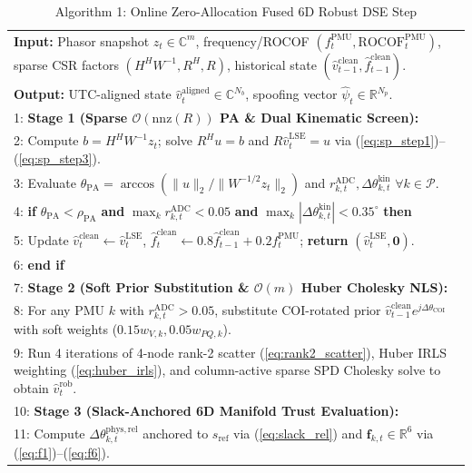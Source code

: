 \documentclass[journal,twoside]{IEEEtran}
\begin{document}
\begin{table}[!t]
\centering
\footnotesize
\caption{Algorithm 1: Online Zero-Allocation Fused 6D Robust DSE Step}
\label{tab:algo1}
\begin{tabular}{p{8.3cm}}
\toprule
\textbf{Input:} Phasor snapshot $z_t \in \mathbb{C}^m$, frequency/ROCOF $(f_t^{\mathrm{PMU}}, \mathrm{ROCOF}_t^{\mathrm{PMU}})$, sparse CSR factors $(H^H W^{-1}, R^H, R)$, historical state $(\hat{v}_{t-1}^{\mathrm{clean}}, \hat{f}_{t-1}^{\mathrm{clean}})$. \\
\textbf{Output:} UTC-aligned state $\hat{v}_t^{\mathrm{aligned}} \in \mathbb{C}^{N_b}$, spoofing vector $\hat{\psi}_t \in \mathbb{R}^{N_p}$. \\
\midrule
1: \textbf{Stage 1 (Sparse $\mathcal{O}(\mathrm{nnz}(R))$ PA \& Dual Kinematic Screen):} \\
2: Compute $b = H^H W^{-1}z_t$; solve $R^H u = b$ and $R\hat{v}_t^{\mathrm{LSE}} = u$ via (\ref{eq:sp_step1})--(\ref{eq:sp_step3}). \\
3: Evaluate $\theta_{\mathrm{PA}} = \arccos(\|u\|_2 / \|W^{-1/2}z_t\|_2)$ and $r_{k,t}^{\mathrm{ADC}}, \Delta\theta_{k,t}^{\mathrm{kin}}$ $\forall k \in \mathcal{P}$. \\
4: \textbf{if} $\theta_{\mathrm{PA}} < \rho_{\mathrm{PA}}$ \textbf{and} $\max_k r_{k,t}^{\mathrm{ADC}} < 0.05$ \textbf{and} $\max_k |\Delta\theta_{k,t}^{\mathrm{kin}}| < 0.35^\circ$ \textbf{then} \\
5: \quad Update $\hat{v}_t^{\mathrm{clean}} \gets \hat{v}_t^{\mathrm{LSE}}$, $\hat{f}_t^{\mathrm{clean}} \gets 0.8\hat{f}_{t-1}^{\mathrm{clean}} + 0.2 f_t^{\mathrm{PMU}}$; \textbf{return} $(\hat{v}_t^{\mathrm{LSE}}, \mathbf{0})$. \\
6: \textbf{end if} \\
7: \textbf{Stage 2 (Soft Prior Substitution \& $\mathcal{O}(m)$ Huber Cholesky NLS):} \\
8: For any PMU $k$ with $r_{k,t}^{\mathrm{ADC}} > 0.05$, substitute COI-rotated prior $\hat{v}_{t-1}^{\mathrm{clean}}e^{j\Delta\theta_{\mathrm{COI}}}$ with soft weights ($0.15 w_{V,k}, 0.05 w_{PQ,k}$). \\
9: Run 4 iterations of 4-node rank-2 scatter (\ref{eq:rank2_scatter}), Huber IRLS weighting (\ref{eq:huber_irls}), and column-active sparse SPD Cholesky solve to obtain $\hat{v}_t^{\mathrm{rob}}$. \\
10: \textbf{Stage 3 (Slack-Anchored 6D Manifold Trust Evaluation):} \\
11: Compute $\Delta\theta_{k,t}^{\mathrm{phys,rel}}$ anchored to $s_{\mathrm{ref}}$ via (\ref{eq:slack_rel}) and $\mathbf{f}_{k,t} \in \mathbb{R}^6$ via (\ref{eq:f1})--(\ref{eq:f6}). \\

\end{tabular}
\end{table}
\end{document}
